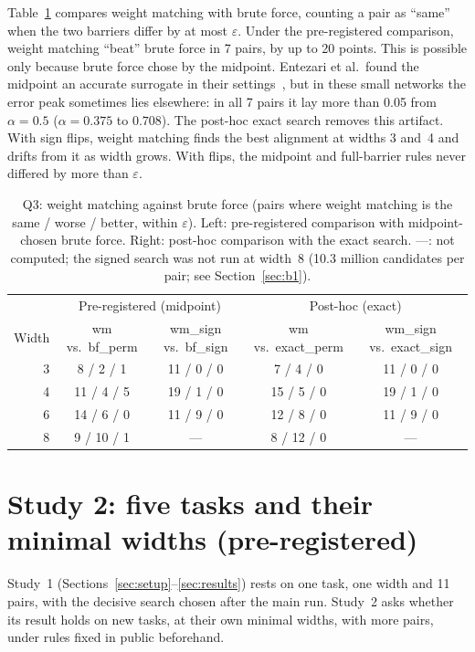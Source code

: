 \documentclass[11pt]{article}
\newcommand{\md}[1]{\textsf{#1}}
\newcommand{\eps}{\varepsilon}
\begin{document}
Table~\ref{tab:q3} compares weight matching with brute force, counting a pair as ``same'' when the two barriers differ by at most $\eps$. Under the pre-registered comparison, weight matching ``beat'' brute force in 7 pairs, by up to 20 points. This is possible only because brute force chose by the midpoint. Entezari et al.\ found the midpoint an accurate surrogate in their settings~\cite[footnote~3]{entezari2022role}, but in these small networks the error peak sometimes lies elsewhere: in all 7 pairs it lay more than 0.05 from $\alpha = 0.5$ ($\alpha = 0.375$ to $0.708$). The post-hoc exact search removes this artifact. With sign flips, weight matching finds the best alignment at widths 3 and~4 and drifts from it as width grows. With flips, the midpoint and full-barrier rules never differed by more than $\eps$.

\begin{table}[t]
\centering
\small
\caption{Q3: weight matching against brute force (pairs where weight matching is the same / worse / better, within $\eps$). Left: pre-registered comparison with midpoint-chosen brute force. Right: post-hoc comparison with the exact search. ---: not computed; the signed search was not run at width~8 (10.3 million candidates per pair; see Section~\ref{sec:b1}).}
\label{tab:q3}
\begin{tabular}{@{}rcc|cc@{}}
\toprule
 & \multicolumn{2}{c|}{Pre-registered (midpoint)} & \multicolumn{2}{c}{Post-hoc (exact)} \\
Width & \md{wm} vs.\ \md{bf\_perm} & \md{wm\_sign} vs.\ \md{bf\_sign} & \md{wm} vs.\ \md{exact\_perm} & \md{wm\_sign} vs.\ \md{exact\_sign} \\
\midrule
3 & 8 / 2 / 1 & 11 / 0 / 0 & 7 / 4 / 0 & 11 / 0 / 0 \\
4 & 11 / 4 / 5 & 19 / 1 / 0 & 15 / 5 / 0 & 19 / 1 / 0 \\
6 & 14 / 6 / 0 & 11 / 9 / 0 & 12 / 8 / 0 & 11 / 9 / 0 \\
8 & 9 / 10 / 1 & --- & 8 / 12 / 0 & --- \\
\bottomrule
\end{tabular}
\end{table}

\section{Study 2: five tasks and their minimal widths (pre-registered)}
\label{sec:v2}

Study~1 (Sections~\ref{sec:setup}--\ref{sec:results}) rests on one task, one width and 11 pairs, with the decisive search chosen after the main run. Study~2 asks whether its result holds on new tasks, at their own minimal widths, with more pairs, under rules fixed in public beforehand.
\end{document}
